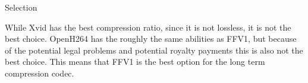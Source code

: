 \documentclass[letterpaper,10pt,onecolumn,draftclsnofoot]{IEEEtran}
\begin{document}
Selection

While Xvid has the best compression ratio, since it is not lossless, it is not the best choice.
OpenH264 has the roughly the same abilities as FFV1, but because of the potential legal problems and potential royalty payments this is also not the best choice.
This means that FFV1 is the best option for the long term compression codec.



\end{document}
